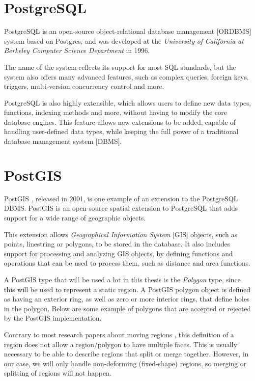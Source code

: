\section{PostgreSQL}

PostgreSQL  is an open-source object-relational database management [ORDBMS] system based on Postgres, and was developed at the \textit{University of California at  Berkeley Computer Science Department} in 1996.

The name of the system reflects its support for most SQL standards, but the system also offers many advanced features, such as complex queries, foreign keys, triggers, multi-version concurrency control and more. 

PostgreSQL is also highly extensible, which allows users to define new data types, functions, indexing methods and more, without having to modify the core database engines. This feature allows new extensions to be added, capable of handling user-defined data types, while keeping the full power of a traditional database management system [DBMS].

\section{PostGIS}

PostGIS , released in 2001, is one example of an extension to the PostgreSQL DBMS. PostGIS is an open-source spatial extension to PostgreSQL that adds support for a wide range of geographic objects. 

This extension allows \textit{Geographical Information System} [GIS] objects, such as points, linestring or polygons, to be stored in the database. It also includes support for processing and analyzing GIS objects, by defining functions and operations that can be used to process them, such as distance and area functions.

A PostGIS type that will be used a lot in this thesis is the \textit{Polygon} type, since this will be used to represent a static region. A PostGIS polygon object is defined as having an exterior ring, as well as zero or more interior rings, that define holes in the polygon. Below are some example of polygons that are accepted or rejected by the PostGIS implementation.


Contrary to most research papers about moving regions , this definition of a region does not allow a region/polygon to have multiple faces. This is usually necessary to be able to describe regions that split or merge together. However, in our case, we will only handle non-deforming (fixed-shape) regions, so merging or splitting of regions will not happen.

